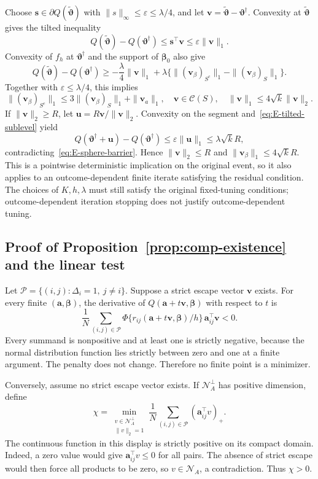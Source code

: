 Choose $\bm{s}\in\partial Q(\widetilde{\bm{\vartheta}})$ with $\|s\|_\infty\le\varepsilon\le\lambda/4$, and let $\bm{v}=\widetilde{\bm{\vartheta}}-\bm{\vartheta}^\dagger$. Convexity at $\widetilde{\bm{\vartheta}}$ gives the tilted inequality
\begin{equation}
 Q(\widetilde{\bm{\vartheta}})-Q(\bm{\vartheta}^\dagger)
 \le \bm{s}^\top \bm{v}\le\varepsilon\|\bm{v}\|_1.
 \label{eq:E-tilted-sublevel}
\end{equation}
Convexity of $f_h$ at $\bm{\vartheta}^\dagger$ and the support of $\bm{\beta}_0$ also give
\[
 Q(\widetilde{\bm{\vartheta}})-Q(\bm{\vartheta}^\dagger)
 \ge-\frac\lambda4\|\bm{v}\|_1+
             \lambda\{\|(\bm{v}_\beta)_{S^c}\|_1-\|(\bm{v}_\beta)_S\|_1\}.
\]
Together with $\varepsilon\le\lambda/4$, this implies
\[
 \|(\bm{v}_\beta)_{S^c}\|_1\le3\|(\bm{v}_\beta)_S\|_1+\|\bm{v}_a\|_1,
 \quad \bm{v}\in\mathcal C(S),\quad \|\bm{v}\|_1\le4\sqrt{k}\|\bm{v}\|_2.
\]
If $\|\bm{v}\|_2\ge R$, let $\bm{u}=R\bm{v}/\|\bm{v}\|_2$. Convexity on the segment and~\eqref{eq:E-tilted-sublevel} yield
\[
 Q(\bm{\vartheta}^\dagger+\bm{u})-Q(\bm{\vartheta}^\dagger)
 \le\varepsilon\|\bm{u}\|_1\le\lambda\sqrt{k}R,
\]
contradicting~\eqref{eq:E-sphere-barrier}. Hence $\|\bm{v}\|_2\le R$ and $\|\bm{v}_\beta\|_1\le4\sqrt{k}R$. This is a pointwise deterministic implication on the original event, so it also applies to an outcome-dependent finite iterate satisfying the residual condition. The choices of $K,h,\lambda$ must still satisfy the original fixed-tuning conditions; outcome-dependent iteration stopping does not justify outcome-dependent tuning.

\subsection{Proof of Proposition~\ref{prop:comp-existence} and the linear test}
\label{subapp:comp-existence}
Let $\mathcal P=\{(i,j):\Delta_i=1,\ j\ne i\}$. Suppose a strict escape vector $\bm{v}$ exists. For every finite $(\bm{a},\bm{\beta})$, the derivative of $Q(\bm{a}+t\bm{v},\bm{\beta})$ with respect to $t$ is
\[
 \frac1N\sum_{(i,j)\in\mathcal P}
     \Phi\{r_{ij}(\bm{a}+t\bm{v},\bm{\beta})/h\}\,\bm{a}_{ij}^\top \bm{v}<0.
\]
Every summand is nonpositive and at least one is strictly negative, because the normal distribution function lies strictly between zero and one at a finite argument. The penalty does not change. Therefore no finite point is a minimizer.

Conversely, assume no strict escape vector exists. If $\mathcal N_A^\perp$ has positive dimension, define
\[
 \chi=\min_{\substack{v\in\mathcal N_A^\perp\\\|v\|_2=1}}
           \frac1N\sum_{(i,j)\in\mathcal P}(\bm{a}_{ij}^\top v)_+.
\]
The continuous function in this display is strictly positive on its compact domain. Indeed, a zero value would give $\bm{a}_{ij}^\top v\le0$ for all pairs. The absence of strict escape would then force all products to be zero, so $v\in\mathcal N_A$, a contradiction. Thus $\chi>0$.

